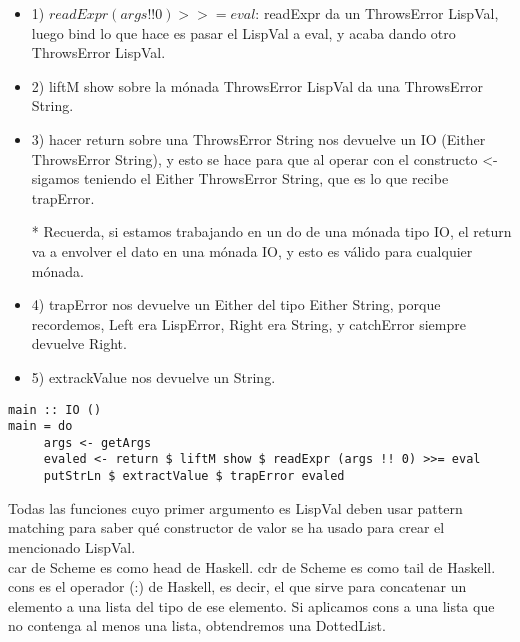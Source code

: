 \begin{itemize}

\item 1) $readExpr (args !! 0) >>= eval$: readExpr da un ThrowsError LispVal, luego bind lo que hace es pasar el LispVal a eval, y acaba dando otro ThrowsError LispVal.

\item 2) liftM show sobre la m\'onada ThrowsError LispVal da una ThrowsError String.

\item 3) hacer return sobre una ThrowsError String nos devuelve un IO (Either ThrowsError String), y esto se hace para que al operar con el constructo <- sigamos teniendo el Either ThrowsError String, que es lo que recibe trapError.

* Recuerda, si estamos trabajando en un do de una m\'onada tipo IO, el return va a envolver el dato en una m\'onada IO, y esto es v\'alido para cualquier m\'onada.

\item 4) trapError nos devuelve un Either del tipo Either String, porque recordemos, Left era LispError, Right era String, y catchError siempre devuelve Right.

\item 5) extrackValue nos devuelve un String.
\end{itemize}

\begin{minipage}{\linewidth}
\begin{small}
\begin{lstlisting}[frame=single]
main :: IO ()
main = do
     args <- getArgs
     evaled <- return $ liftM show $ readExpr (args !! 0) >>= eval
     putStrLn $ extractValue $ trapError evaled
\end{lstlisting}
\end{small}
\end{minipage}

Todas las funciones cuyo primer argumento es LispVal deben usar pattern matching para saber qu\'e constructor de valor se ha usado para crear el mencionado LispVal.\\

car de Scheme es como head de Haskell. cdr de Scheme es  como tail de Haskell.\\

cons es el operador (:) de Haskell, es decir, el que sirve para concatenar un elemento a una lista del tipo de ese elemento. Si aplicamos cons a una lista que no contenga al menos una lista, obtendremos una DottedList.\\

